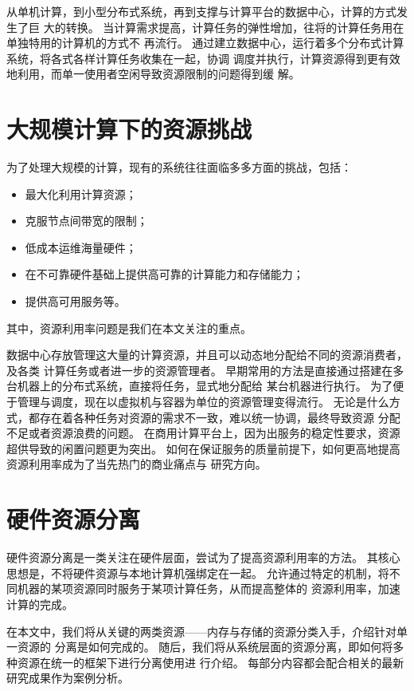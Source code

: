 从单机计算，到小型分布式系统，再到支撑与计算平台的数据中心，计算的方式发生了巨
大的转换。
当计算需求提高，计算任务的弹性增加，往将的计算任务用在单独特用的计算机的方式不
再流行。
通过建立数据中心，运行着多个分布式计算系统，将各式各样计算任务收集在一起，协调
调度并执行，计算资源得到更有效地利用，而单一使用者空闲导致资源限制的问题得到缓
解。

\section{大规模计算下的资源挑战}

为了处理大规模的计算，现有的系统往往面临多多方面的挑战，包括：
\begin{itemize}
    \item
    最大化利用计算资源；
    \item
    克服节点间带宽的限制；
    \item 
    低成本运维海量硬件；
    \item
    在不可靠硬件基础上提供高可靠的计算能力和存储能力；
    \item
    提供高可用服务等。
\end{itemize}

其中，资源利用率问题是我们在本文关注的重点。

数据中心存放管理这大量的计算资源，并且可以动态地分配给不同的资源消费者，及各类
计算任务或者进一步的资源管理者\cite{zhang2010cloud}。
早期常用的方法是直接通过搭建在多台机器上的分布式系统，直接将任务，显式地分配给
某台机器进行执行。
为了便于管理与调度，现在以虚拟机与容器为单位的资源管理变得流行。
无论是什么方式，都存在着各种任务对资源的需求不一致，难以统一协调，最终导致资源
分配不足或者资源浪费的问题。
在商用计算平台上，因为出服务的稳定性要求，资源超供导致的闲置问题更为突出。
如何在保证服务的质量前提下，如何更高地提高资源利用率成为了当先热门的商业痛点与
研究方向。

\section{硬件资源分离}

硬件资源分离是一类关注在硬件层面，尝试为了提高资源利用率的方法。
其核心思想是，不将硬件资源与本地计算机强绑定在一起。
允许通过特定的机制，将不同机器的某项资源同时服务于某项计算任务，从而提高整体的
资源利用率，加速计算的完成。

在本文中，我们将从关键的两类资源——内存与存储的资源分类入手，介绍针对单一资源的
分离是如何完成的。
随后，我们将从系统层面的资源分离，即如何将多种资源在统一的框架下进行分离使用进
行介绍。
每部分内容都会配合相关的最新研究成果作为案例分析。
